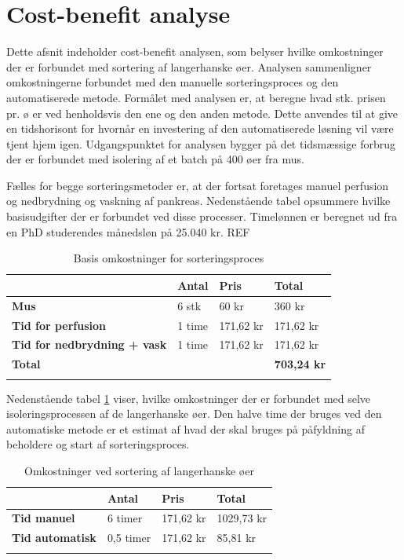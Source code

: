 \newpage
\section{Cost-benefit analyse}
Dette afsnit indeholder cost-benefit analysen, som belyser hvilke omkostninger der er forbundet med sortering af langerhanske øer. Analysen sammenligner omkostningerne forbundet med den manuelle sorteringsproces og den automatiserede metode. Formålet med analysen er, at beregne hvad stk. prisen pr. ø er ved henholdsvis den ene og den anden metode. Dette anvendes til at give en tidshorisont for hvornår en investering af den automatiserede løsning vil være tjent hjem igen. Udgangspunktet for analysen bygger på det tidsmæssige forbrug der er forbundet med isolering af et batch på 400 øer fra mus. 

Fælles for begge sorteringsmetoder er, at der fortsat foretages manuel perfusion og nedbrydning og vaskning af pankreas. Nedenstående tabel opsummere hvilke basisudgifter der er forbundet ved disse processer. Timelønnen er beregnet ud fra en PhD studerendes månedsløn på 25.040 kr. REF
\begin{center}
		\begin{longtable}{ | m{6cm} | m{1.5cm} | m{1.5cm} | m{3cm}| } 
			\hline
			 &\textbf{Antal} & \textbf{Pris} & \textbf{Total}\\ 
			\hline
			 \textbf{Mus} & 6 stk & 60 kr & 360 kr\\ 
			\hline
			 \textbf{Tid for perfusion} & 1 time & 171,62 kr & 171,62 kr\\ 
			\hline
			\textbf{Tid for nedbrydning + vask} & 1 time & 171,62 kr & 171,62 kr\\ 
			\hline	
			\textbf{Total} &  &  & \textbf{703,24 kr}\\ 
			\hline
			\caption{Basis omkostninger for sorteringsproces}
			 		\end{longtable}
\end{center}
Nedenstående tabel \ref{tab:sortcost} viser, hvilke omkostninger der er forbundet med selve isoleringsprocessen af de langerhanske øer. Den halve time der bruges ved den automatiske metode er et estimat af hvad der skal bruges på påfyldning af beholdere og start af sorteringsproces. 
\begin{center}
		\begin{longtable}{ | m{6cm} | m{1.5cm} | m{1.5cm} | m{3cm}| } 
			\hline
			 &\textbf{Antal} & \textbf{Pris} & \textbf{Total}\\ 
			\hline
			 \textbf{Tid manuel} & 6 timer & 171,62 kr & 1029,73 kr\\ 
			\hline
			 \textbf{Tid automatisk} & 0,5 timer & 171,62 kr & 85,81 kr\\ 
			\hline
			\caption{Omkostninger ved sortering af langerhanske øer}
			\label{tab:sortcost}
			 		\end{longtable}
\end{center}
